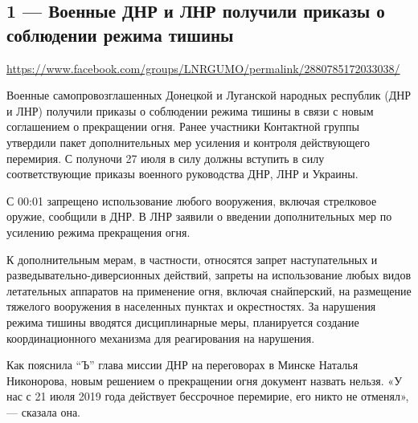  
 

\subsection{1 --- Военные ДНР и ЛНР получили приказы о соблюдении режима тишины}
\label{sec:27_07_2020.fb.lnr.1}
\url{https://www.facebook.com/groups/LNRGUMO/permalink/2880785172033038/}


Военные самопровозглашенных Донецкой и Луганской народных республик (ДНР и
ЛНР) получили приказы о соблюдении режима тишины в связи с новым соглашением о
прекращении огня. Ранее участники Контактной группы утвердили пакет
дополнительных мер усиления и контроля действующего перемирия. С полуночи 27
июля в силу должны вступить в силу соответствующие приказы военного
руководства ДНР, ЛНР и Украины.

С 00:01 запрещено использование любого вооружения, включая стрелковое оружие,
сообщили в ДНР. В ЛНР заявили о введении дополнительных мер по усилению режима
прекращения огня.

К дополнительным мерам, в частности, относятся запрет наступательных и
разведывательно-диверсионных действий, запреты на использование любых видов
летательных аппаратов на применение огня, включая снайперский, на размещение
тяжелого вооружения в населенных пунктах и окрестностях. За нарушения режима
тишины вводятся дисциплинарные меры, планируется создание координационного
механизма для реагирования на нарушения.

Как пояснила “Ъ” глава миссии ДНР на переговорах в Минске Наталья Никонорова,
новым решением о прекращении огня документ назвать нельзя. «У нас с 21 июля
2019 года действует бессрочное перемирие, его никто не отменял»,— сказала она.
